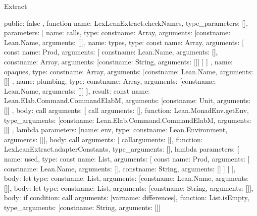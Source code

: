 \begin{lexlean}{Extract}
\begin{toolingmodule}
{{      public: false
    },
    function{
      name: LexLeanExtract.checkNames,
      type_parameters: [],
      parameters: [
        {name: calls, type: const{name: Array, arguments: [const{name: Lean.Name, arguments: []}]}},
        {
          name: types,
          type: const{
            name: Array,
            arguments: [
              const{
                name: Prod,
                arguments: [
                  const{name: Lean.Name, arguments: []},
                  const{name: Array, arguments: [const{name: String, arguments: []}]}
                ]
              }
            ]
          }
        },
        {
          name: opaques,
          type: const{name: Array, arguments: [const{name: Lean.Name, arguments: []}]}
        },
        {
          name: plumbing,
          type: const{name: Array, arguments: [const{name: Lean.Name, arguments: []}]}
        }
      ],
      result: const{
        name: Lean.Elab.Command.CommandElabM,
        arguments: [const{name: Unit, arguments: []}]
      },
      body: call{
        arguments: [
          call{
            arguments: [],
            function: Lean.MonadEnv.getEnv,
            type_arguments: [const{name: Lean.Elab.Command.CommandElabM, arguments: []}]
          },
          lambda{
            parameters: [{name: env, type: const{name: Lean.Environment, arguments: []}}],
            body: call{
              arguments: [
                call{arguments: [], function: LexLeanExtract.adapterConstants, type_arguments: []},
                lambda{
                  parameters: [
                    {
                      name: used,
                      type: const{
                        name: List,
                        arguments: [
                          const{
                            name: Prod,
                            arguments: [
                              const{name: Lean.Name, arguments: []},
                              const{name: String, arguments: []}
                            ]
                          }
                        ]
                      }
                    }
                  ],
                  body: let{
                    type: const{name: List, arguments: [const{name: Lean.Name, arguments: []}]},
                    body: let{
                      type: const{name: List, arguments: [const{name: String, arguments: []}]},
                      body: if{
                        condition: call{
                          arguments: [var{name: differences}],
                          function: List.isEmpty,
                          type_arguments: [const{name: String, arguments: []}]
}}}}}}}}}}
\end{toolingmodule}
\end{lexlean}

